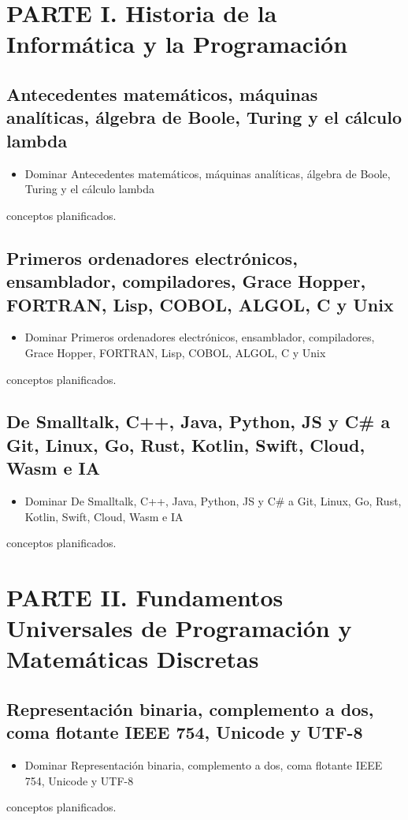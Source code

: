 \documentclass{book}
\begin{document}
\section*{PARTE I. Historia de la Informática y la Programación}

\subsection*{\checkmark Antecedentes matemáticos, máquinas analíticas, álgebra de Boole, Turing y el cálculo lambda}
\begin{itemize}
\item Dominar Antecedentes matemáticos, máquinas analíticas, álgebra de Boole, Turing y el cálculo lambda
\end{itemize}
 conceptos planificados.

\subsection*{\checkmark Primeros ordenadores electrónicos, ensamblador, compiladores, Grace Hopper, FORTRAN, Lisp, COBOL, ALGOL, C y Unix}
\begin{itemize}
\item Dominar Primeros ordenadores electrónicos, ensamblador, compiladores, Grace Hopper, FORTRAN, Lisp, COBOL, ALGOL, C y Unix
\end{itemize}
 conceptos planificados.

\subsection*{\checkmark De Smalltalk, C++, Java, Python, JS y C\# a Git, Linux, Go, Rust, Kotlin, Swift, Cloud, Wasm e IA}
\begin{itemize}
\item Dominar De Smalltalk, C++, Java, Python, JS y C\# a Git, Linux, Go, Rust, Kotlin, Swift, Cloud, Wasm e IA
\end{itemize}
 conceptos planificados.

\section*{PARTE II. Fundamentos Universales de Programación y Matemáticas Discretas}

\subsection*{\checkmark Representación binaria, complemento a dos, coma flotante IEEE 754, Unicode y UTF-8}
\begin{itemize}
\item Dominar Representación binaria, complemento a dos, coma flotante IEEE 754, Unicode y UTF-8
\end{itemize}
 conceptos planificados.
\end{document}
